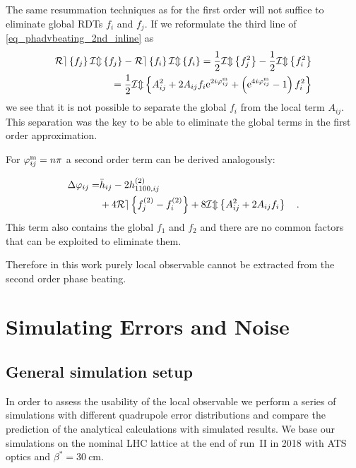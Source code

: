 The same resummation techniques as for the first order will not suffice to eliminate
global RDTs $f_i$ and $f_j$.
If we reformulate the third line of \eqref{eq_phadvbeating_2nd_inline} as
\begin{align}
   \mathcal{Re} \left\{ f_j \right\} \mathcal{Im} \left\{ f_j \right\} - \mathcal{Re} \left\{ f_i \right\} \mathcal{Im} \left\{ f_i \right\}  = 
   \frac{1}{2}\mathcal{Im} \left\{ f_j^2 \right\} - \frac{1}{2}\mathcal{Im} \left\{ f_i^2 \right\} \notag \\
    = \frac{1}{2} \mathcal{Im} \left\{  
     A_{ij}^2 + 2A_{ij}f_i\text{e}^{2i\varphi_{ij}^\text{m}} + 
     \left( \text{e}^{4i\varphi_{ij}^\text{m}} - 1 \right) f_{i}^2 \right\}
  \label{eq_expanding2ndorder}
\end{align}
we see that it is not possible to separate the global $f_i$ from the local term $A_{ij}$. This
separation was the key to be able to eliminate the global terms in the first order approximation.

For $\varphi_{ij}^\text{m} = n\pi$ a second order term can be derived analogously:

\begin{align}
  \Delta\varphi_{ij} = & \bar{h}_{ij} - 2h_{1100,ij}^{(2)} \notag \\
  &+ 4\mathcal{Re} \left\{ f_j^{(2)}-f_i^{(2)} \right\} + 8\mathcal{Im} \left\{ A_{ij}^{2}+ 2A_{ij}f_i \right\}
  \quad .
  \label{eq_npi_second}
\end{align}
This term also contains the global $f_1$ and $f_2$ and there are no common factors that can be exploited
to eliminate them.

Therefore in this work purely local observable cannot be extracted from the second order phase beating.


\section{Simulating Errors and Noise}
\label{sec_lobster}
\label{sec:robustness_check}

\subsection{General simulation setup}

In order to assess the usability of the local observable we perform a series of simulations with different
quadrupole error distributions and compare the prediction of the analytical calculations with simulated results. 
We base our simulations on the nominal LHC lattice at the end of run~II in 2018 with ATS optics and 
$\beta^*=\SI{30}{\centi\metre}$.

